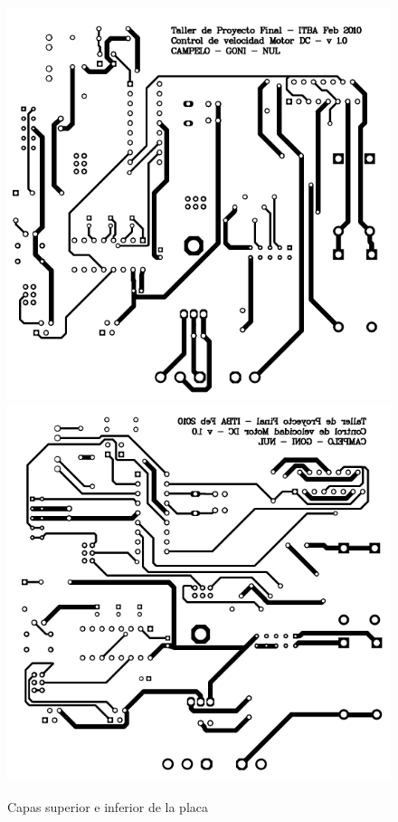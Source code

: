 \documentclass[a4paper,10pt]{article}
\begin{document}
\begin{figure}
\centering
\includegraphics[scale=.3]{top.png}
\includegraphics[scale=.3]{bottom.png}
\caption{Capas superior e inferior de la placa}
\label{capas}
\end{figure}
\end{document}
